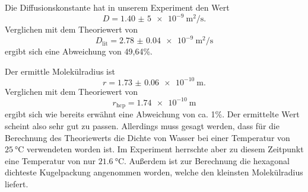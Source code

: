 Die Diffusionskonstante hat in unserem Experiment den Wert 
\begin{equation*}
  D= \SI{1,40(5)e-9}{\meter^2\per\second}.
\end{equation*}
Verglichen mit dem Theoriewert\cite{diff} von 
\begin{equation*}
  D_\text{lit} = \SI{2.78(4)e-9}{\metre^2\per\second}
\end{equation*}
ergibt sich eine Abweichung von 49,64\%.

Der ermittle Molekülradius ist
\begin{equation*}
  r = \SI{1.73(6)e-10}{\meter}.
\end{equation*}
Verglichen mit dem Theoriewert von
\begin{equation*}
  r_\text{hcp}= \SI{1.74e-10}{\metre}
\end{equation*}
ergibt sich wie bereits erwähnt eine Abweichung von ca. 1\%.
Der ermittelte Wert scheint also sehr gut zu passen. 
Allerdings muss gesagt werden, dass für die Berechnung des Theoriewerts die Dichte von Wasser bei einer 
Temperatur von $\SI{25}{\celsius}$ verwendeten worden ist.
Im Experiment herrschte aber zu diesem Zeitpunkt eine Temperatur von nur $\SI{21,6}{\celsius}$.
Außerdem ist zur Berechnung die hexagonal dichteste Kugelpackung angenommen worden, 
welche den kleinsten Molekülradius liefert.
%
\newpage
\nocite{*}
\printbibliography{}
